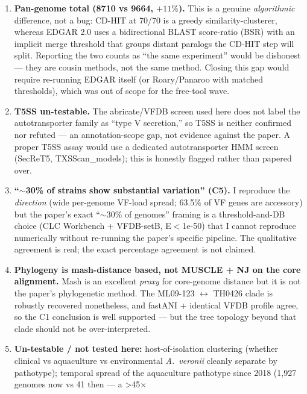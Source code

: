 \documentclass[11pt]{article}
\begin{document}
\begin{enumerate}
  \item \textbf{Pan-genome total (8710 vs 9664, $+11\%$).} This is a genuine
        \emph{algorithmic} difference, not a bug: CD-HIT at 70/70 is a greedy
        similarity-clusterer, whereas EDGAR 2.0 uses a bidirectional BLAST
        score-ratio (BSR) with an implicit merge threshold that groups distant
        paralogs the CD-HIT step will split. Reporting the two counts as ``the
        same experiment'' would be dishonest --- they are cousin methods, not the
        same method. Closing this gap would require re-running EDGAR itself
        (or Roary/Panaroo with matched thresholds), which was out of scope for
        the free-tool wave.
  \item \textbf{T5SS un-testable.} The abricate/VFDB screen used here does not
        label the autotransporter family as ``type V secretion,'' so T5SS is
        neither confirmed nor refuted --- an annotation-scope gap, not evidence
        against the paper. A proper T5SS assay would use a dedicated
        autotransporter HMM screen (SecReT5, TXSScan\_models); this is honestly
        flagged rather than papered over.
  \item \textbf{``$\sim$30\% of strains show substantial variation'' (C5).} I reproduce
        the \emph{direction} (wide per-genome VF-load spread; 63.5\% of VF genes are
        accessory) but the paper's exact ``$\sim$30\% of genomes'' framing is a
        threshold-and-DB choice (CLC Workbench + VFDB-setB, E$<$1e-50) that I
        cannot reproduce numerically without re-running the paper's specific
        pipeline. The qualitative agreement is real; the exact percentage
        agreement is not claimed.
  \item \textbf{Phylogeny is mash-distance based, not MUSCLE + NJ on the core
        alignment.} Mash is an excellent \emph{proxy} for core-genome distance
        but it is not the paper's phylogenetic method. The ML09-123 $\leftrightarrow$ TH0426
        clade is robustly recovered nonetheless, and fastANI + identical VFDB
        profile agree, so the C1 conclusion is well supported --- but the tree
        topology beyond that clade should not be over-interpreted.
  \item \textbf{Un-testable / not tested here:} host-of-isolation clustering
        (whether clinical vs aquaculture vs environmental \emph{A.\ veronii}
        cleanly separate by pathotype); temporal spread of the aquaculture
        pathotype since 2018 (1{,}927 genomes now vs 41 then --- a >45$\times$

\end{enumerate}
\end{document}
